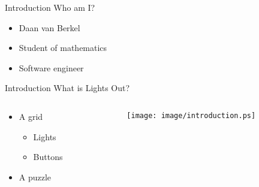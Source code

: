 \begin{frame}{Introduction}
	Who am I?
	\begin{itemize}
		\item Daan van Berkel
		\item Student of mathematics
		\item Software engineer
	\end{itemize}
\end{frame}

\begin{frame}{Introduction}
	What is Lights Out?
	\begin{columns}[T]
		\begin{column}{0.45\textwidth}
			\begin{itemize}
				\item A grid
				\begin{itemize}
					\item Lights
					\item Buttons
				\end{itemize}
				\item A puzzle
			\end{itemize}
		\end{column}
		
		\begin{column}{0.45\textwidth}
			\centerline{\texttt{[image: image/introduction.ps]}}
		\end{column}
	\end{columns}
\end{frame}

